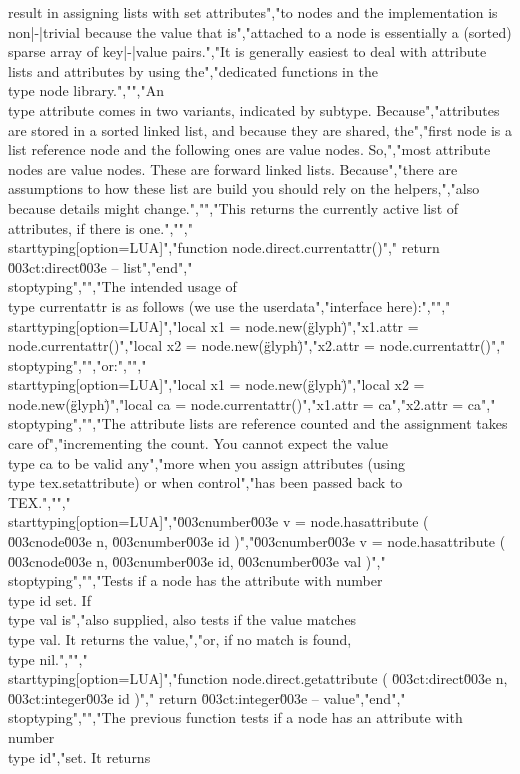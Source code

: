 result in assigning lists with set attributes","to nodes and the implementation is non|-|trivial because the value that is","attached to a node is essentially a (sorted) sparse array of key|-|value pairs.","It is generally easiest to deal with attribute lists and attributes by using the","dedicated functions in the \\type {node} library.","","An \\type {attribute} comes in two variants, indicated by subtype. Because","attributes are stored in a sorted linked list, and because they are shared, the","first node is a list reference node and the following ones are value nodes. So,","most attribute nodes are value nodes. These are forward linked lists. Because","there are assumptions to how these list are build you should rely on the helpers,","also because details might change.","","This returns the currently active list of attributes, if there is one.","","\\starttyping[option=LUA]","function node.direct.currentattr()","    return \u003ct:direct\u003e -- list","end","\\stoptyping","","The intended usage of \\type {currentattr} is as follows (we use the userdata","interface here):","","\\starttyping[option=LUA]","local x1 = node.new(\"glyph\")","x1.attr = node.currentattr()","local x2 = node.new(\"glyph\")","x2.attr = node.currentattr()","\\stoptyping","","or:","","\\starttyping[option=LUA]","local x1 = node.new(\"glyph\")","local x2 = node.new(\"glyph\")","local ca = node.currentattr()","x1.attr = ca","x2.attr = ca","\\stoptyping","","The attribute lists are reference counted and the assignment takes care of","incrementing the count. You cannot expect the value \\type {ca} to be valid any","more when you assign attributes (using \\type {tex.setattribute}) or when control","has been passed back to \\TEX.","","\\starttyping[option=LUA]","\u003cnumber\u003e v = node.hasattribute ( \u003cnode\u003e n, \u003cnumber\u003e id )","\u003cnumber\u003e v = node.hasattribute ( \u003cnode\u003e n, \u003cnumber\u003e id, \u003cnumber\u003e val )","\\stoptyping","","Tests if a node has the attribute with number \\type {id} set. If \\type {val} is","also supplied, also tests if the value matches \\type {val}. It returns the value,","or, if no match is found, \\type {nil}.","","\\starttyping[option=LUA]","function node.direct.getattribute ( \u003ct:direct\u003e n, \u003ct:integer\u003e id )","    return \u003ct:integer\u003e -- value","end","\\stoptyping","","The previous function tests if a node has an attribute with number \\type {id}","set. It returns 